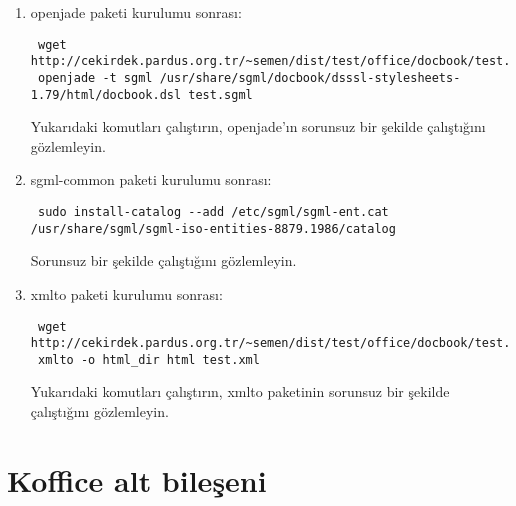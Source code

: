 \documentclass[a4paper,10pt]{article}
\begin{document}
\begin{enumerate}
\item openjade paketi kurulumu sonrası:
\begin{verbatim}
 wget http://cekirdek.pardus.org.tr/~semen/dist/test/office/docbook/test.sgml
 openjade -t sgml /usr/share/sgml/docbook/dsssl-stylesheets-1.79/html/docbook.dsl test.sgml
\end{verbatim}

Yukarıdaki komutları çalıştırın, openjade'ın sorunsuz bir şekilde çalıştığını gözlemleyin.

\item sgml-common paketi kurulumu sonrası:
\begin{verbatim}
 sudo install-catalog --add /etc/sgml/sgml-ent.cat /usr/share/sgml/sgml-iso-entities-8879.1986/catalog
\end{verbatim}

Sorunsuz bir şekilde çalıştığını gözlemleyin.
\item xmlto paketi kurulumu sonrası:

\begin{verbatim}
 wget http://cekirdek.pardus.org.tr/~semen/dist/test/office/docbook/test.xml
 xmlto -o html_dir html test.xml
\end{verbatim}

Yukarıdaki komutları çalıştırın, xmlto paketinin sorunsuz bir şekilde çalıştığını gözlemleyin.
\end{enumerate}
\section{Koffice alt bileşeni}
\end{document}
